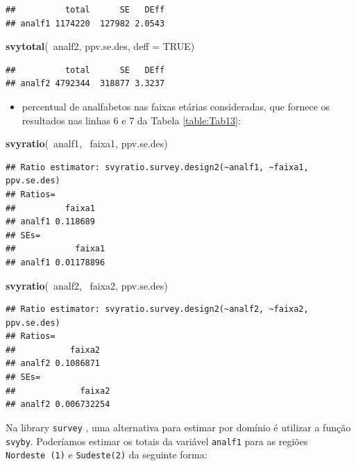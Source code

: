 \documentclass[]{book}
\newenvironment{Shaded}{\begin{snugshade}}{\end{snugshade}}
\newcommand{\KeywordTok}[1]{\textcolor[rgb]{0.13,0.29,0.53}{\textbf{{#1}}}}
\newcommand{\DataTypeTok}[1]{\textcolor[rgb]{0.13,0.29,0.53}{{#1}}}
\newcommand{\OtherTok}[1]{\textcolor[rgb]{0.56,0.35,0.01}{{#1}}}
\newcommand{\NormalTok}[1]{{#1}}
\providecommand{\tightlist}{%
  \setlength{\itemsep}{0pt}\setlength{\parskip}{0pt}}
\numberwithin{example}{chapter}
\numberwithin{remark}{chapter}
\numberwithin{definition}{chapter}
\begin{document}
\begin{verbatim}
##          total      SE   DEff
## analf1 1174220  127982 2.0543
\end{verbatim}

\begin{Shaded}
\begin{Highlighting}[]
\KeywordTok{svytotal}\NormalTok{(~analf2, ppv.se.des, }\DataTypeTok{deff =} \OtherTok{TRUE}\NormalTok{)}
\end{Highlighting}
\end{Shaded}

\begin{verbatim}
##          total      SE   DEff
## analf2 4792344  318877 3.3237
\end{verbatim}

\begin{itemize}
\tightlist
\item
  percentual de analfabetos nas faixas etárias consideradas, que fornece
  os resultados nas linhas 6 e 7 da Tabela \ref{table:Tab13}:
\end{itemize}

\begin{Shaded}
\begin{Highlighting}[]
\KeywordTok{svyratio}\NormalTok{(~analf1, ~faixa1, ppv.se.des)}
\end{Highlighting}
\end{Shaded}

\begin{verbatim}
## Ratio estimator: svyratio.survey.design2(~analf1, ~faixa1, ppv.se.des)
## Ratios=
##          faixa1
## analf1 0.118689
## SEs=
##            faixa1
## analf1 0.01178896
\end{verbatim}

\begin{Shaded}
\begin{Highlighting}[]
\KeywordTok{svyratio}\NormalTok{(~analf2, ~faixa2, ppv.se.des)}
\end{Highlighting}
\end{Shaded}

\begin{verbatim}
## Ratio estimator: svyratio.survey.design2(~analf2, ~faixa2, ppv.se.des)
## Ratios=
##           faixa2
## analf2 0.1086871
## SEs=
##             faixa2
## analf2 0.006732254
\end{verbatim}

Na library \texttt{survey} \citep{R-survey}, uma alternativa para
estimar por domínio é utilizar a função \texttt{svyby}. Poderíamos
estimar os totais da variável \texttt{analf1} para as regiões
\texttt{Nordeste\ (1)} e \texttt{Sudeste(2)} da seguinte forma:
\end{document}
